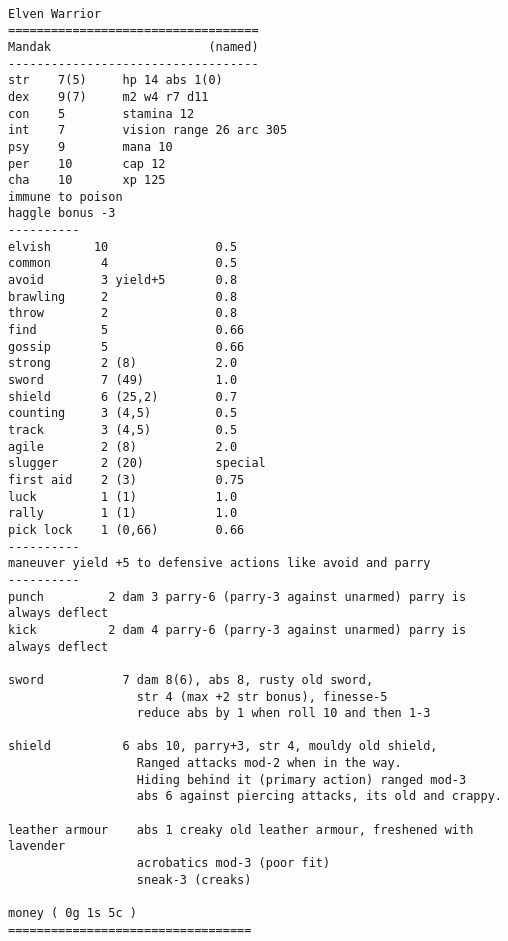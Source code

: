 \

\goodbreak
\tiny \begin{samepage} \begin{verbatim}
Elven Warrior
===================================
Mandak                      (named)
-----------------------------------
str    7(5)     hp 14 abs 1(0)
dex    9(7)     m2 w4 r7 d11
con    5        stamina 12
int    7        vision range 26 arc 305
psy    9        mana 10
per    10       cap 12
cha    10       xp 125
immune to poison
haggle bonus -3
----------
elvish      10               0.5
common       4               0.5
avoid        3 yield+5       0.8
brawling     2               0.8
throw        2               0.8
find         5               0.66
gossip       5               0.66
strong       2 (8)           2.0
sword        7 (49)          1.0
shield       6 (25,2)        0.7
counting     3 (4,5)         0.5
track        3 (4,5)         0.5
agile        2 (8)           2.0
slugger      2 (20)          special
first aid    2 (3)           0.75
luck         1 (1)           1.0
rally        1 (1)           1.0
pick lock    1 (0,66)        0.66
----------
maneuver yield +5 to defensive actions like avoid and parry
----------
punch         2 dam 3 parry-6 (parry-3 against unarmed) parry is always deflect
kick          2 dam 4 parry-6 (parry-3 against unarmed) parry is always deflect

sword           7 dam 8(6), abs 8, rusty old sword,
                  str 4 (max +2 str bonus), finesse-5
                  reduce abs by 1 when roll 10 and then 1-3

shield          6 abs 10, parry+3, str 4, mouldy old shield,
                  Ranged attacks mod-2 when in the way.
                  Hiding behind it (primary action) ranged mod-3
                  abs 6 against piercing attacks, its old and crappy.

leather armour    abs 1 creaky old leather armour, freshened with lavender
                  acrobatics mod-3 (poor fit)
                  sneak-3 (creaks)

money ( 0g 1s 5c )
==================================
\end{verbatim} \end{samepage} \normalsize


\

